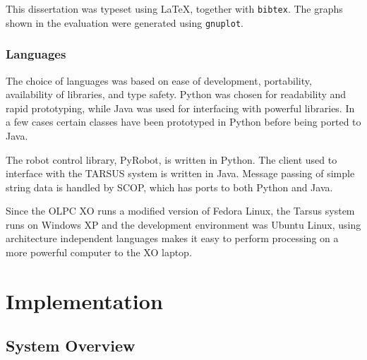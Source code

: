 \documentclass[12pt,a4,notitlepage]{report}
\renewcommand{\_}{\texttt{\symbol{95}}}
\newcommand{\<}{\texttt{\symbol{60}}}
\renewcommand{\>}{\texttt{\symbol{62}}}
\begin{document}
This dissertation was typeset using \LaTeX, together with \texttt{bibtex}. The graphs shown in the evaluation were generated using \texttt{gnuplot}.

\subsection{Languages}

The choice of languages was based on ease of development, portability, availability of libraries, and type safety. Python was chosen for readability and rapid prototyping, while Java was used for interfacing with powerful libraries. In a few cases certain classes have been prototyped in Python before being ported to Java.

The robot control library, PyRobot, is written in Python. The client used to interface with the TARSUS system is written in Java\cite{bodyPaint}. Message passing of simple string data is handled by SCOP, which has ports to both Python and Java.

Since the OLPC XO runs a modified version of Fedora Linux, the Tarsus system runs on Windows XP and the development environment was Ubuntu Linux, using architecture independent languages makes it easy to perform processing on a more powerful computer to the XO laptop.

\chapter{Implementation}

\section{System Overview}
\end{document}
